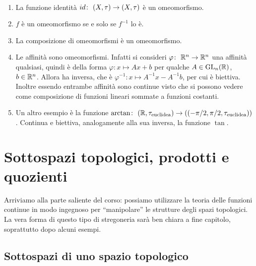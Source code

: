 \begin{example} \
\begin{enumerate}
	\item La funzione identità $id \colon\ (X,\tau) \rightarrow (X,\tau)$ è un omeomorfismo. 
	\item $f$ è un omeomorfismo se e solo se $f^{-1}$ lo è. 
	\item La composizione di omeomorfismi è un omeomorfismo.
	\item Le affinità sono omeomorfismi. Infatti si consideri $\varphi \colon\ \mathbb{R}^n \rightarrow \mathbb{R}^n$ una affinità qualsiasi, quindi è della forma $\varphi \colon x \mapsto Ax + b$ per qualche $A \in \operatorname{GL}_n(\mathbb{R})$, $b \in \mathbb{R}^n$. Allora ha inversa, che è $\varphi^{-1} \colon x \mapsto A^{-1}x - A^{-1}b$, per cui è biettiva. Inoltre essendo entrambe affinità sono continue visto che si possono vedere come composizione di funzioni lineari sommate a funzioni costanti.
	\item Un altro esempio è la funzione $\arctan \colon\ (\mathbb{R}, \tau_{\text{euclidea}}) \rightarrow ((-\pi/2,\pi/2, \tau_{\text{euclidea}}))$. Continua e biettiva, analogamente alla sua inversa, la funzione $\tan$.
\end{enumerate}
\end{example}


\section{Sottospazi topologici, prodotti e quozienti}
Arriviamo alla parte saliente del corso: possiamo utilizzare la teoria delle funzioni continue in modo ingegnoso per \enquote{manipolare} le strutture degli spazi topologici. \\ La vera forma di questo tipo di stregoneria sarà ben chiara a fine capitolo, soprattutto dopo alcuni esempi.
\subsection{\textcolor{TopGener}{\textbf{Sottospazi di uno spazio topologico}}}



